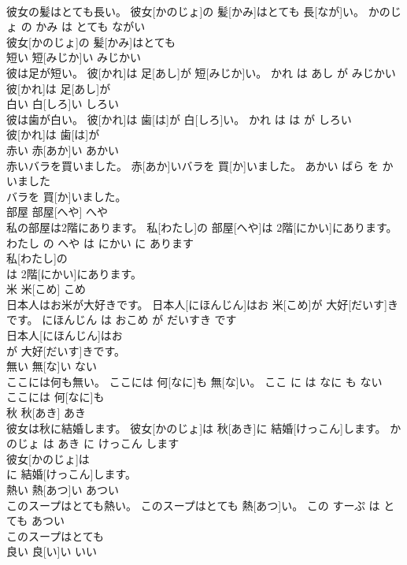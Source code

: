 \documentclass[8pt]{extreport}
\begin{document}
\begin{CJK}{UTF8}{min}
\\	彼女の髪はとても長い。	彼女[かのじょ]の 髪[かみ]はとても 長[なが]い。	かのじょ の かみ は とても ながい	
\\	彼女[かのじょ]の 髪[かみ]はとても
\\	短い	短[みじか]い	みじかい	
\\	彼は足が短い。	彼[かれ]は 足[あし]が 短[みじか]い。	かれ は あし が みじかい	
\\	彼[かれ]は 足[あし]が
\\	白い	白[しろ]い	しろい	
\\	彼は歯が白い。	彼[かれ]は 歯[は]が 白[しろ]い。	かれ は は が しろい	
\\	彼[かれ]は 歯[は]が
\\	赤い	赤[あか]い	あかい	
\\	赤いバラを買いました。	赤[あか]いバラを 買[か]いました。	あかい ばら を かいました	
\\	バラを 買[か]いました。			
\\	部屋	部屋[へや]	へや	
\\	私の部屋は2階にあります。	私[わたし]の 部屋[へや]は 2階[にかい]にあります。	わたし の へや は にかい に あります	
\\	私[わたし]の
\\	は 2階[にかい]にあります。			
\\	米	米[こめ]	こめ	
\\	日本人はお米が大好きです。	日本人[にほんじん]はお 米[こめ]が 大好[だいす]きです。	にほんじん は おこめ が だいすき です	
\\	日本人[にほんじん]はお
\\	が 大好[だいす]きです。			
\\	無い	無[な]い	ない	
\\	ここには何も無い。	ここには 何[なに]も 無[な]い。	ここ に は なに も ない	
\\	ここには 何[なに]も
\\	秋	秋[あき]	あき	
\\	彼女は秋に結婚します。	彼女[かのじょ]は 秋[あき]に 結婚[けっこん]します。	かのじょ は あき に けっこん します	
\\	彼女[かのじょ]は
\\	に 結婚[けっこん]します。			
\\	熱い	熱[あつ]い	あつい	
\\	このスープはとても熱い。	このスープはとても 熱[あつ]い。	この すーぷ は とても あつい	
\\	このスープはとても
\\	良い	良[い]い	いい	

\end{CJK}
\end{document}

